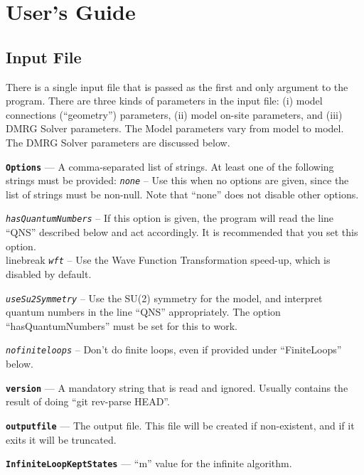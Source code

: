 \documentclass[paper=letter]{scrartcl}
\newcommand{\inputItem}[1]{\noindent\texttt{\bf #1} ---}
\newcommand{\inputSubItem}[1]{\indent\texttt{\it #1} --}
\begin{document}
\section{User's Guide}
\subsection{Input File} \label{sec:inputfile}
There is a single input file that is passed as the first
and only argument to the program.
There are three kinds of parameters in the input file:
(i) model connections (``geometry'') parameters, (ii) model on-site parameters, and (iii) DMRG Solver parameters.
The Model parameters vary from model to model.
The DMRG Solver parameters are discussed below.

\inputItem{Options} A comma-separated list of strings. At least one of the following strings must be provided: \inputSubItem{none} Use this when no options are given, since the list of strings must be non-null. Note that ``none'' does not disable other options.

\inputSubItem{hasQuantumNumbers} If this option is given, the program will read the line ``QNS'' described below and act accordingly. It is recommended that you set this option. \\linebreak \inputSubItem{wft} Use the Wave Function Transformation speed-up, which is disabled by default.

\inputSubItem{useSu2Symmetry} Use the SU(2) symmetry for the model, and interpret quantum numbers in the line ``QNS'' appropriately. The option ``hasQuantumNumbers'' must be set for this to work.

\inputSubItem{nofiniteloops} Don't do finite loops, even if provided under ``FiniteLoops'' below.

\inputItem{version} A mandatory string that is read and ignored. Usually contains the result of doing ``git rev-parse HEAD''.

\inputItem{outputfile} The output file. This file will be created if non-existent, and if it exits it will be truncated.

\inputItem{InfiniteLoopKeptStates} ``m'' value for the infinite algorithm.
\end{document}
